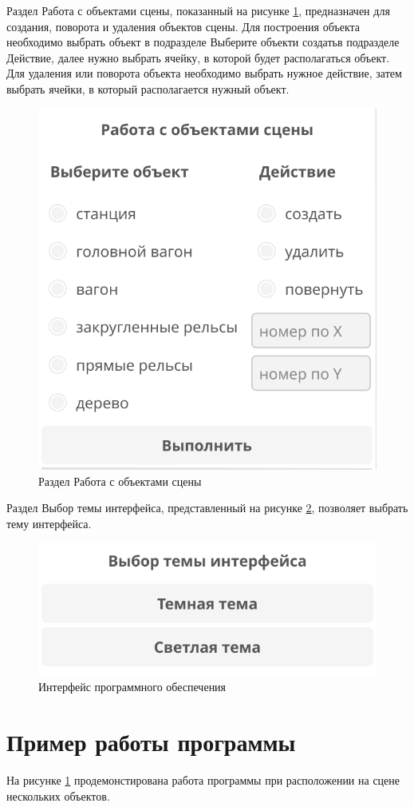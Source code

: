Раздел \guillemotleft Работа с объектами сцены\guillemotright, показанный на рисунке \ref{img:create}, предназначен для создания, поворота и удаления объектов сцены.
Для построения объекта необходимо выбрать объект в подразделе \guillemotleft Выберите объект\guillemotright и 
\guillemotleft создать\guillemotright в подразделе \guillemotleft Действие\guillemotright, далее нужно выбрать ячейку, в которой будет
располагаться объект. Для удаления или поворота объекта необходимо выбрать нужное действие, затем выбрать ячейки, в который располагается
нужный объект.

\clearpage
\begin{figure}[h]
    \centering
    \includegraphics[width=0.65\linewidth]{img/create.png}
    \caption{Раздел \guillemotleft Работа с объектами сцены\guillemotright}
    \label{img:create}
\end{figure}
\noindent

Раздел \guillemotleft Выбор темы интерфейса\guillemotright, представленный на рисунке \ref{img:theme}, позволяет выбрать тему интерфейса.
\begin{figure}[h]
    \centering
    \includegraphics[width=0.7\linewidth]{img/theme.png}
    \caption{Интерфейс программного обеспечения}
    \label{img:theme}
\end{figure}
\noindent


\section{Пример работы программы}

На рисунке \ref{} продемонстирована работа программы при расположении на сцене нескольких объектов.





